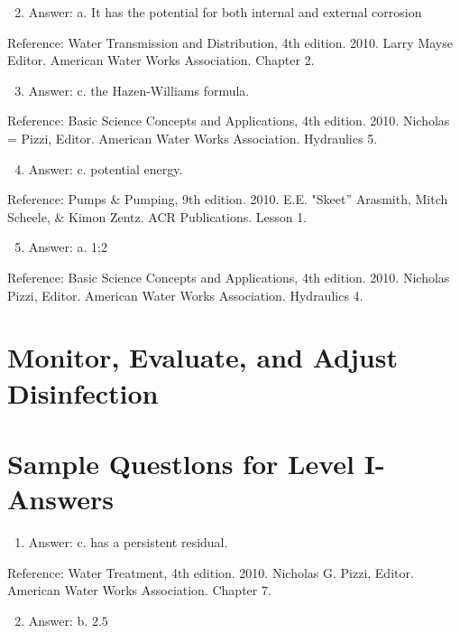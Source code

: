 \documentclass[10pt]{article}
\begin{document}
\begin{enumerate}
  \setcounter{enumi}{1}
  \item Answer: a. It has the potential for both internal and external corrosion
\end{enumerate}

Reference: Water Transmission and Distribution, 4th edition. 2010. Larry Mayse Editor. American Water Works Association. Chapter 2.

\begin{enumerate}
  \setcounter{enumi}{2}
  \item Answer: c. the Hazen-Williams formula.
\end{enumerate}

Reference: Basic Science Concepts and Applications, 4th edition. 2010. Nicholas = Pizzi, Editor. American Water Works Association. Hydraulics 5.

\begin{enumerate}
  \setcounter{enumi}{3}
  \item Answer: c. potential energy.
\end{enumerate}

Reference: Pumps \& Pumping, 9th edition. 2010. E.E. "Skeet” Arasmith, Mitch Scheele, \& Kimon Zentz. ACR Publications. Lesson 1.

\begin{enumerate}
  \setcounter{enumi}{4}
  \item Answer: a. 1;2
\end{enumerate}

Reference: Basic Science Concepts and Applications, 4th edition. 2010. Nicholas Pizzi, Editor. American Water Works Association. Hydraulics 4.

\section{Monitor, Evaluate, and Adjust Disinfection}
\section{Sample Questlons for Level I-Answers}
\begin{enumerate}
  \item Answer: c. has a persistent residual.
\end{enumerate}

Reference: Water Treatment, 4th edition. 2010. Nicholas G. Pizzi, Editor. American Water Works Association. Chapter 7.

\begin{enumerate}
  \setcounter{enumi}{1}
  \item Answer: b. $2.5$
\end{enumerate}
\end{document}
